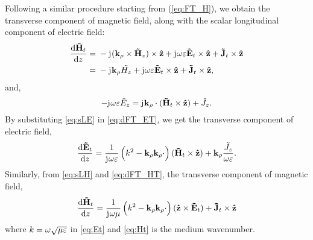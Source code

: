 \documentclass[12pt]{article}
\begin{document}
Following a similar procedure starting from (\ref{eq:FT_H}), we obtain the transverse component of magnetic field, along with the scalar longitudinal component of electric field:
%
\begin{equation}
\begin{split}
\dv{\v{\ti{H}}_t}{z} ={}& -\j (\v{k}_{\p} \x \v{\ti{H}}_z) \x \v{\^{z}}
+ \j \O \E \v{\ti{E}}_t \x \v{\^{z}} +
\v{\ti{J}}_t \x \v{\^{z}} \\
={}& -\j \v{k}_{\p} \ti{{H}_z} + \j \O \E \v{\ti{E}}_t \x \v{\^{z}}  +
\v{\ti{J}}_t \x \v{\^{z}},
\end{split}
\label{eq:dFT_HT}%
\end{equation}
%
and,
\begin{equation}
-\mathrm{j}\mkern1mu \omega \varepsilon \tilde{E}_z =
\mathrm{j}\mkern1mu \mathbf{k}_{\rho} \cdot (\mathbf{\tilde{H}}_t \times \mathbf{\hat{z}}) + \tilde{J}_z.
\label{eq:FT_LE}
\end{equation}
%
By substituting \eqref{eq:sLE} in \eqref{eq:dFT_ET}, we get the transverse component of electric field,
%
\begin{equation}
\dv{\mathbf{\tilde{E}}_t}{z} =
\frac{1}{\mathrm{j}\mkern1mu \omega \varepsilon} \left( k^2 - \mathbf{k}_{\rho}\mathbf{k}_{\rho} \cdot \right) (\mathbf{\tilde{H}}_t \times \mathbf{\hat{z}}) + \mathbf{k}_{\rho} \frac{\tilde{J}_z}{\omega \varepsilon}.
\label{eq:Et}
\end{equation}
%
Similarly, from \eqref{eq:sLH} and \eqref{eq:dFT_HT}, the transverse component of magnetic field,
%
\begin{equation}
\dv{\mathbf{\tilde{H}}_t}{z} =
\frac{1}{\mathrm{j}\mkern1mu \omega \mu} \left( k^2 - \mathbf{k}_{\rho}\mathbf{k}_{\rho} \cdot \right) (\mathbf{\hat{z}} \times \mathbf{\tilde{E}}_t) + \mathbf{\tilde{J}}_t
\times \mathbf{\hat{z}}
\label{eq:Ht}
\end{equation}
%
where $k = \omega \sqrt{\mu \varepsilon}$ in \eqref{eq:Et} and \eqref{eq:Ht} is the medium wavenumber.
\end{document}
